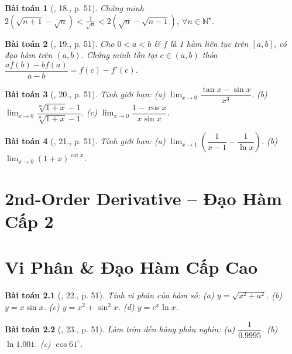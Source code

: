 \documentclass[oneside]{book}
\newtheorem{baitoan}{Bài toán}
\begin{document}
\begin{baitoan}[\cite{TLCT_BT_dai_so_giai_tich_11}, 18., p. 51]
	Chứng minh $2(\sqrt{n + 1} - \sqrt{n}) < \frac{1}{\sqrt{n}} < 2(\sqrt{n} - \sqrt{n - 1})$, $\forall n\in\mathbb{N}^\star$.
\end{baitoan}

\begin{baitoan}[\cite{TLCT_BT_dai_so_giai_tich_11}, 19., p. 51]
	Cho $0 < a < b$ \& $f$ là 1 hàm liên tục trên $[a,b]$, có đạo hàm trên $(a,b)$. Chứng minh tồn tại $c\in(a,b)$ thỏa $\dfrac{af(b) - bf(a)}{a - b} = f(c) - f'(c)$.
\end{baitoan}

\begin{baitoan}[\cite{TLCT_BT_dai_so_giai_tich_11}, 20., p. 51]
	Tính giới hạn: (a) $\lim_{x\to0} \dfrac{\tan x - \sin x}{x^3}$. (b) $\lim_{x\to0} \dfrac{\sqrt[m]{1 + x} - 1}{\sqrt[n]{1 + x} - 1}$. (c) $\lim_{x\to0} \dfrac{1 - \cos x}{x\sin x}$.
\end{baitoan}

\begin{baitoan}[\cite{TLCT_BT_dai_so_giai_tich_11}, 21., p. 51]
	Tính giới hạn: (a) $\lim_{x\to1} \left(\dfrac{1}{x - 1} - \dfrac{1}{\ln x}\right)$. (b) $\lim_{x\to0} (1 + x)^{\cot x}$.
\end{baitoan}


\chapter{2nd-Order Derivative -- Đạo Hàm Cấp 2}
\minitoc


\chapter{Vi Phân \& Đạo Hàm Cấp Cao}
\minitoc

\begin{baitoan}[\cite{TLCT_BT_dai_so_giai_tich_11}, 22., p. 51]
	Tính vi phân của hàm số: (a) $y = \sqrt{x^2 + a^2}$. (b) $y = x\sin x$. (c) $y = x^2 + \sin^2x$. (d) $y = e^x\ln x$.
\end{baitoan}

\begin{baitoan}[\cite{TLCT_BT_dai_so_giai_tich_11}, 23., p. 51]
	Làm tròn đến hàng phần nghìn: (a) $\dfrac{1}{0.9995}$. (b) $\ln1.001$. (c) $\cos61^\circ$.
\end{baitoan}
\end{document}
